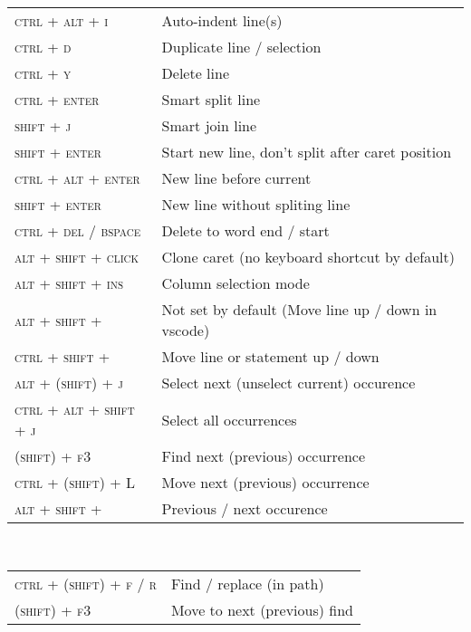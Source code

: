 \documentclass[10pt,a4paper]{article}
\newenvironment{mycolorbox}[2]{%
\begin{tcolorbox}[grow to left by=-1em,grow to right by=-1em,capture=minipage,fonttitle=\large\bfseries, enhanced jigsaw,boxsep=1mm,colback=#1!30!white,on line,tcbox width=auto, toptitle=0mm,colframe=#1,opacityback=0.25,nobeforeafter,title=#2]%
}{\end{tcolorbox}\\[0.2em]}
\newenvironment{textbox}[1]{\begin{mycolorbox}{customcolor}{#1}}{\end{mycolorbox}}
\newcommand{\scut}[1]{\textsc{#1}}
\begin{document}
\begin{multicols}{2}
\begin{textbox}{Text Editing}
{
{\renewcommand{\arraystretch}{1.4}
\begin{tabularx}{\textwidth}{>{\setlength\hsize{.38\hsize}\raggedleft\arraybackslash}X|X}
\scut{ctrl + alt + i}	&	Auto-indent line(s)	\\
\scut{ctrl + d}	&	Duplicate line / selection	\\
\scut{ctrl + y}	&	Delete line	\\
\scut{ctrl + enter}	&	Smart split line	\\
\scut{shift + j}	&	Smart join line	\\
\scut{shift + enter}	&	Start new line, don't split after caret position	\\
\scut{ctrl + alt + enter}	&	New line before current	\\
\scut{shift + enter}	&	New line without spliting line	\\
\scut{ctrl + del / bspace}	&	Delete to word end / start	\\
\scut{alt + shift + click}	&	Clone caret (no keyboard shortcut by default) \\
\scut{alt + shift + ins}	&	Column selection mode	\\
\scut{alt + shift + \textuparrow{}\textdownarrow}	&	Not set by default (Move line up / down	in vscode) \\
\scut{ctrl + shift + \textuparrow{}\textdownarrow}	&	Move line or statement up / down	\\
\scut{alt + (shift) + j}	&	Select next (unselect current) occurence	\\
\scut{ctrl + alt + shift + j}	&	Select all occurrences	\\
\scut{(shift) + f3}	&	Find next (previous) occurrence	\\
\scut{ctrl + (shift) + L}	&	Move next (previous) occurrence	\\
\scut{alt + shift + \textuparrow{}\textdownarrow}	&	Previous / next occurence	
\end{tabularx}}}
\end{textbox}

\begin{textbox}{Search}
{
{\renewcommand{\arraystretch}{1.4}
\begin{tabularx}{\textwidth}{>{\setlength\hsize{.38\hsize}\raggedleft\arraybackslash}X|X}
\scut{ctrl + (shift) + f / r}	&	Find / replace (in path) 	\\
\scut{(shift) + f3}	&	Move to next (previous) find	
\end{tabularx}}}
\end{textbox}


\end{multicols}
\end{document}
